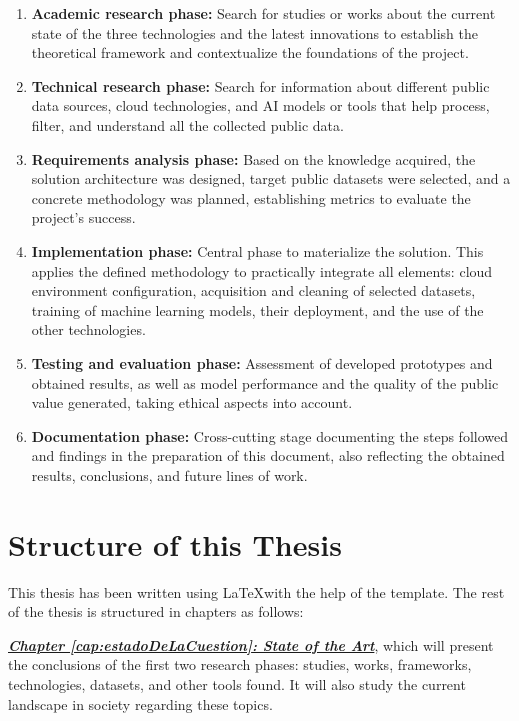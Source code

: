 \begin{enumerate}
	
	\item \textbf{Academic research phase:} Search for studies or works about the current state of the three technologies and the latest innovations to establish the theoretical framework and contextualize the foundations of the project.
	
	\item \textbf{Technical research phase:} Search for information about different public data sources, cloud technologies, and AI models or tools that help process, filter, and understand all the collected public data.
	
	\item \textbf{Requirements analysis phase:} Based on the knowledge acquired, the solution architecture was designed, target public datasets were selected, and a concrete methodology was planned, establishing metrics to evaluate the project's success.
	
	\item \textbf{Implementation phase:} Central phase to materialize the solution. This applies the defined methodology to practically integrate all elements: cloud environment configuration, acquisition and cleaning of selected datasets, training of machine learning models, their deployment, and the use of the other technologies.
	
	\item \textbf{Testing and evaluation phase:} Assessment of developed prototypes and obtained results, as well as model performance and the quality of the public value generated, taking ethical aspects into account.
	
	\item \textbf{Documentation phase:} Cross-cutting stage documenting the steps followed and findings in the preparation of this document, also reflecting the obtained results, conclusions, and future lines of work.
	
	
\end{enumerate}

\section{Structure of this Thesis}

This thesis has been written using \LaTeX\space with the help of the \texis\space template. The rest of the thesis is structured in chapters as follows:

\hyperref[cap:estadoDeLaCuestion]{\textbf{\textit{Chapter \ref*{cap:estadoDeLaCuestion}: State of the Art}}}, which will present the conclusions of the first two research phases: studies, works, frameworks, technologies, datasets, and other tools found. It will also study the current landscape in society regarding these topics.

